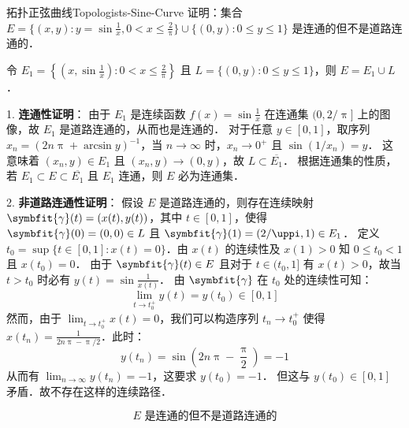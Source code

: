 \begin{problem}{拓扑正弦曲线}{Topologists-Sine-Curve}
    证明：集合 $E = \{(x,y) : y = \sin \frac{1}{x}, 0 < x \le \frac{2}{\uppi}\} \cup \{(0,y) : 0 \le y \le 1\}$ 是连通的但不是道路连通的．

    \begin{center}
    \end{center}
\end{problem}

\begin{myproof}
    令 $E_1 = \left\{ \left(x, \sin \frac{1}{x}\right) : 0 < x \le \frac{2}{\uppi} \right\}$ 且 $L = \{(0, y) : 0 \le y \le 1\}$，则 $E = E_1 \cup L$．

    1. \textbf{连通性证明}：
    由于 $E_1$ 是连续函数 $f(x) = \sin \frac{1}{x}$ 在连通集 $(0, 2/\uppi]$ 上的图像，故 $E_1$ 是道路连通的，从而也是连通的．
    对于任意 $y \in [0, 1]$，取序列 $x_n = \left( 2n\uppi + \arcsin y \right)^{-1}$，当 $n \to \infty$ 时，$x_n \to 0^+$ 且 $\sin(1/x_n) = y$．
    这意味着 $(x_n, y) \in E_1$ 且 $(x_n, y) \to (0, y)$，故 $L \subset \overline{E_1}$．
    根据连通集的性质，若 $E_1 \subset E \subset \overline{E_1}$ 且 $E_1$ 连通，则 $E$ 必为连通集．

    2. \textbf{非道路连通性证明}：
    假设 $E$ 是道路连通的，则存在连续映射 $\symbfit{\gamma}(t) = (x(t), y(t))$，其中 $t \in [0, 1]$，使得 $\symbfit{\gamma}(0) = (0, 0) \in L$ 且 $\symbfit{\gamma}(1) = (2/\uppi, 1) \in E_1$．
    定义 $t_0 = \sup \{ t \in [0, 1] : x(t) = 0 \}$．由 $x(t)$ 的连续性及 $x(1) > 0$ 知 $0 \le t_0 < 1$ 且 $x(t_0) = 0$．
    由于 $\symbfit{\gamma}(t) \in E$ 且对于 $t \in (t_0, 1]$ 有 $x(t) > 0$，故当 $t > t_0$ 时必有 $y(t) = \sin \frac{1}{x(t)}$．
    由 $\symbfit{\gamma}$ 在 $t_0$ 处的连续性可知：
    \begin{equation}
        \lim_{t \to t_0^+} y(t) = y(t_0) \in [0, 1]
    \end{equation}
    然而，由于 $\lim_{t \to t_0^+} x(t) = 0$，我们可以构造序列 $t_n \to t_0^+$ 使得 $x(t_n) = \frac{1}{2n\uppi - \uppi/2}$．此时：
    \begin{equation}
        y(t_n) = \sin\left( 2n\uppi - \frac{\uppi}{2} \right) = -1
    \end{equation}
    从而有 $\lim_{n \to \infty} y(t_n) = -1$，这要求 $y(t_0) = -1$．
    但这与 $y(t_0) \in [0, 1]$ 矛盾．故不存在这样的连续路径．

    \begin{equation}
        \boxed{E \text{ 是连通的但不是道路连通的}}
    \end{equation}
\end{myproof}


